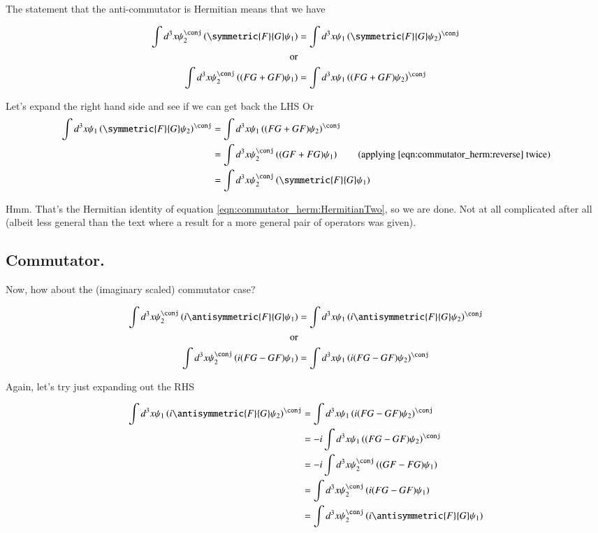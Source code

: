 The statement that the anti-commutator is Hermitian means that we have

\begin{align*}
\int d^3 x \psi_2^\conj \left( \symmetric{F}{G} \psi_1 \right) &= \int d^3 x \psi_1 \left(\symmetric{F}{G} \psi_2 \right)^\conj \\
\text{or} \\
\int d^3 x \psi_2^\conj \left( (F G + G F) \psi_1 \right) &= \int d^3 x \psi_1 \left((F G + G F) \psi_2 \right)^\conj \\
\end{align*}

Let's expand the right hand side and see if we can get back the LHS
Or
\begin{align*}
\int d^3 x \psi_1 \left(\symmetric{F}{G} \psi_2 \right)^\conj 
&=
\int d^3 x \psi_1 \left((F G + G F) \psi_2 \right)^\conj \\
&=
\int d^3 x \psi_2^\conj \left((G F + F G) \psi_1 \right) \quad\quad \text{(applying \ref{eqn:commutator_herm:reverse} twice)} \\
&=
\int d^3 x \psi_2^\conj \left( \symmetric{F}{G} \psi_1 \right) \\
\end{align*}

Hmm.  That's the Hermitian identity of equation \ref{eqn:commutator_herm:HermitianTwo}, so we are done.  Not at all complicated after all (albeit less
general than the text where a result for a more general pair of operators was given).

\subsection{Commutator. }

Now, how about the (imaginary scaled) commutator case?

\begin{align*}
\int d^3 x \psi_2^\conj \left( i \antisymmetric{F}{G} \psi_1 \right) &= \int d^3 x \psi_1 \left( i \antisymmetric{F}{G} \psi_2 \right)^\conj \\
\text{or} \\
\int d^3 x \psi_2^\conj \left( i(F G - G F) \psi_1 \right) &= \int d^3 x \psi_1 \left(i(F G - G F) \psi_2 \right)^\conj \\
\end{align*}

Again, let's try just expanding out the RHS

\begin{align*}
\int d^3 x \psi_1 \left( i \antisymmetric{F}{G} \psi_2 \right)^\conj 
&= \int d^3 x \psi_1 \left(i(F G - G F) \psi_2 \right)^\conj \\
&= -i \int d^3 x \psi_1 \left((F G - G F) \psi_2 \right)^\conj \\
&= -i \int d^3 x \psi_2^\conj \left((G F - F G) \psi_1 \right) \\
&= \int d^3 x \psi_2^\conj \left(i (F G - G F) \psi_1 \right) \\
&= \int d^3 x \psi_2^\conj \left(i \antisymmetric{F}{G}\psi_1 \right) \\
\end{align*}

